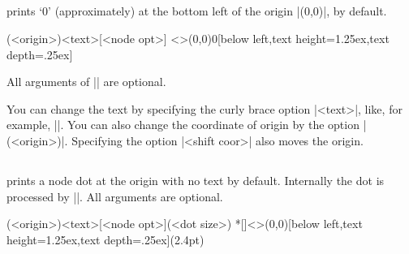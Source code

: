 \subsection{\protect\cmd{\tzshoworigin}}
\label{ss:tzshoworigin}


\icmd{\tzshoworigin} prints `0' (approximately) at the bottom left of the origin |(0,0)|, by default.

\begin{tzdef}
(<origin>){<text>}[<node opt>]
  <>(0,0){0}[below left,text height=1.25ex,text depth=.25ex]
\end{tzdef}

All arguments of |\tzshoworigin| are optional.

\begin{tzcode}{.3}
{}
\end{tzcode}

You can change the text by specifying the curly brace option |{<text>}|, like, for example, ||.
You can also change the coordinate of origin by the option |(<origin>)|.
Specifying the option |<shift coor>| also moves the origin.


\begin{tzcode}{.3}
\end{tzcode}


\subsection{\protect\cmd{\tzshoworigin*}}
\label{ss:tzshoworigin*}


\icmd{\tzshoworigin*} prints a node dot at the origin with no text by default.
Internally the dot is processed by |\tzdot*|. All arguments are optional.

\begin{tzdef}
(<origin>){<text>}[<node opt>](<dot size>)
 *[]<>(0,0){}[below left,text height=1.25ex,text depth=.25ex](2.4pt)
\end{tzdef}

